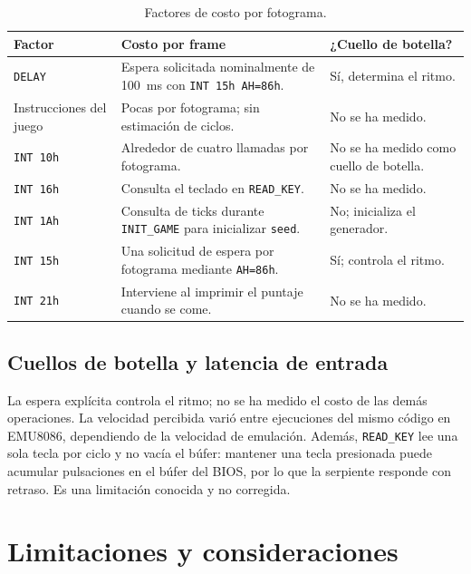 \documentclass[10pt]{article}
\begin{document}
\begin{table}[ht]
\centering
\caption{Factores de costo por fotograma.}
\label{tab:rendimiento}
\begin{tabular}{@{}p{3.6cm}p{6.2cm}p{2.6cm}@{}}
\toprule
Factor & Costo por frame & ¿Cuello de botella? \\
\midrule
\texttt{DELAY} & Espera solicitada nominalmente de 100~ms con \texttt{INT 15h AH=86h}. & Sí, determina el ritmo. \\
Instrucciones del juego & Pocas por fotograma; sin estimación de ciclos. & No se ha medido. \\
\texttt{INT 10h} & Alrededor de cuatro llamadas por fotograma. & No se ha medido como cuello de botella. \\
\texttt{INT 16h} & Consulta el teclado en \texttt{READ\_KEY}. & No se ha medido. \\
\texttt{INT 1Ah} & Consulta de ticks durante \texttt{INIT\_GAME} para inicializar \texttt{seed}. & No; inicializa el generador. \\
\texttt{INT 15h} & Una solicitud de espera por fotograma mediante \texttt{AH=86h}. & Sí; controla el ritmo. \\
\texttt{INT 21h} & Interviene al imprimir el puntaje cuando se come. & No se ha medido. \\
\bottomrule
\end{tabular}
\end{table}

\subsection{Cuellos de botella y latencia de entrada}
La espera explícita controla el ritmo; no se ha medido el costo de las demás operaciones. La velocidad percibida varió entre ejecuciones del mismo código en EMU8086, dependiendo de la velocidad de emulación. Además, \texttt{READ\_KEY} lee una sola tecla por ciclo y no vacía el búfer: mantener una tecla presionada puede acumular pulsaciones en el búfer del BIOS, por lo que la serpiente responde con retraso. Es una limitación conocida y no corregida.

\section{Limitaciones y consideraciones}
\end{document}
